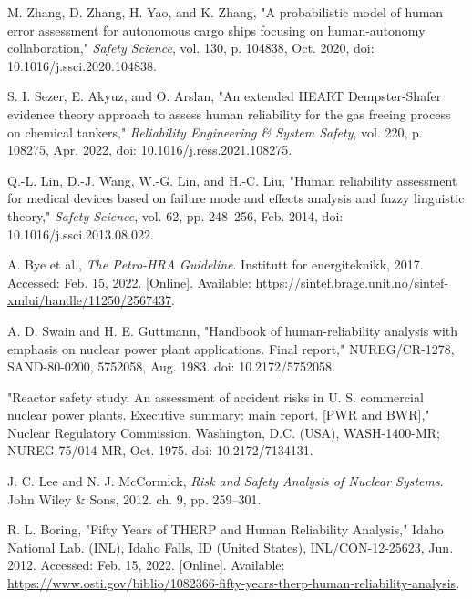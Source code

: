 \documentclass[11pt, letterpaper]{article}
\begin{document}
\begin{thebibliography}{99}

 M. Zhang, D. Zhang, H. Yao, and K. Zhang, "A probabilistic model of human error assessment for autonomous cargo ships focusing on human-autonomy collaboration," \textit{Safety Science}, vol. 130, p. 104838, Oct. 2020, doi: 10.1016/j.ssci.2020.104838.

 S. I. Sezer, E. Akyuz, and O. Arslan, "An extended HEART Dempster-Shafer evidence theory approach to assess human reliability for the gas freeing process on chemical tankers," \textit{Reliability Engineering \& System Safety}, vol. 220, p. 108275, Apr. 2022, doi: 10.1016/j.ress.2021.108275.

 Q.-L. Lin, D.-J. Wang, W.-G. Lin, and H.-C. Liu, "Human reliability assessment for medical devices based on failure mode and effects analysis and fuzzy linguistic theory," \textit{Safety Science}, vol. 62, pp. 248–256, Feb. 2014, doi: 10.1016/j.ssci.2013.08.022.

 A. Bye et al., \textit{The Petro-HRA Guideline}. Institutt for energiteknikk, 2017. Accessed: Feb. 15, 2022. [Online]. Available: \url{https://sintef.brage.unit.no/sintef-xmlui/handle/11250/2567437}.

 A. D. Swain and H. E. Guttmann, "Handbook of human-reliability analysis with emphasis on nuclear power plant applications. Final report," NUREG/CR-1278, SAND-80-0200, 5752058, Aug. 1983. doi: 10.2172/5752058.

 "Reactor safety study. An assessment of accident risks in U. S. commercial nuclear power plants. Executive summary: main report. [PWR and BWR]," Nuclear Regulatory Commission, Washington, D.C. (USA), WASH-1400-MR; NUREG-75/014-MR, Oct. 1975. doi: 10.2172/7134131.

 J. C. Lee and N. J. McCormick, \textit{Risk and Safety Analysis of Nuclear Systems}. John Wiley \& Sons, 2012. ch. 9, pp. 259–301.

 R. L. Boring, "Fifty Years of THERP and Human Reliability Analysis," Idaho National Lab. (INL), Idaho Falls, ID (United States), INL/CON-12-25623, Jun. 2012. Accessed: Feb. 15, 2022. [Online]. Available: \url{https://www.osti.gov/biblio/1082366-fifty-years-therp-human-reliability-analysis}.


\end{thebibliography}
\end{document}
